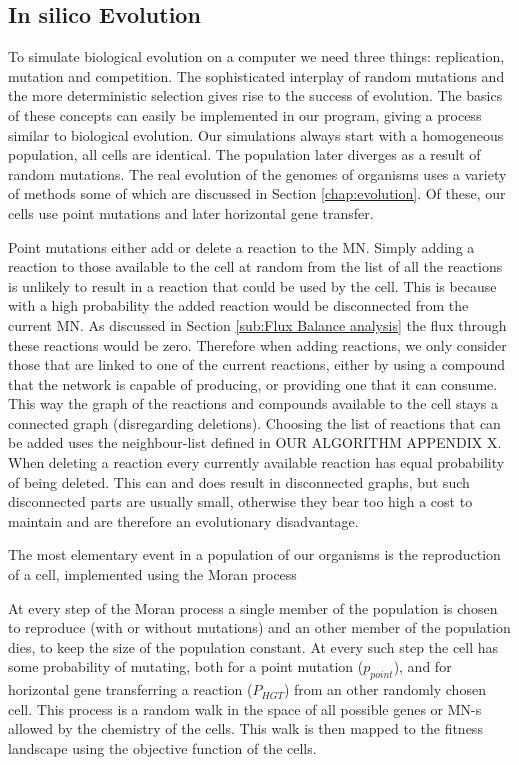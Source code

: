 \documentclass[a4paper,12pt]{article}
\begin{document}
\subsection{In silico Evolution}
\label{sub:implementing evolution}
To simulate biological evolution on a computer we need three things: replication, mutation and competition. The sophisticated interplay of random mutations and the more deterministic selection gives rise to the success of evolution. The basics of these concepts can easily be implemented in our program, giving a process similar to biological evolution. Our simulations always start with a homogeneous population, all cells are identical. The population later diverges as a result of random mutations. The real evolution of the genomes of organisms uses a variety of methods some of which are discussed in Section \ref{chap:evolution}. Of these, our cells use point mutations and later horizontal gene transfer.
	
	Point mutations either add or delete a reaction to the MN. Simply adding a reaction to those available to the cell at random from the list of all the reactions is unlikely to result in a reaction that could be used by the cell. This is because with a high probability the added reaction would be disconnected from the current MN. As discussed in Section \ref{sub:Flux Balance analysis} the flux through these reactions would be zero. Therefore when adding reactions, we only consider those that are linked  to one of the current reactions, either by using a compound that  the network is capable of producing, or providing one that it can consume. %
	This way the graph of the reactions and compounds available to the cell stays a connected graph (disregarding deletions). Choosing the list of reactions that can be added uses the neighbour-list defined in OUR ALGORITHM APPENDIX X. When deleting a reaction every currently available reaction has equal probability of being deleted. This can and does result in disconnected graphs, but such disconnected parts are usually small, otherwise they bear too high a cost to maintain and are therefore an evolutionary disadvantage.
	
The most elementary event in a population of our organisms is the reproduction of a cell, implemented using the Moran process \cite{moranprocess} 

At every step of the Moran process a single member of the population is chosen to reproduce (with or without mutations) and an other member of the population dies, to keep the size of the population constant. At every such step the cell has some probability of mutating, both for a point mutation ($p_{point}$), and for horizontal gene transferring a reaction ($P_{HGT}$) from an other randomly chosen cell.  This process is a random walk in the space of all possible genes or MN-s allowed by the chemistry of the cells.  This walk is then mapped to the fitness landscape using the objective function of the cells.
\end{document}
